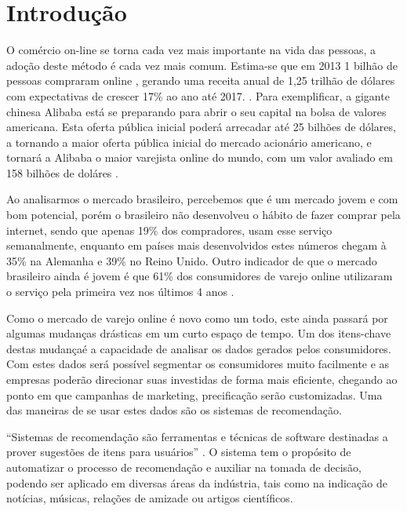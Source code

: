 \chapter[Introdução]{Introdução}
\label{chap:introducao}

O comércio on-line se torna cada vez mais importante na vida das pessoas, a adoção deste método é cada vez mais comum. Estima-se que em 2013 1 bilhão de pessoas compraram online \cite{emarketerB2CEcommerceClimbs}, gerando uma receita anual de 1,25 trilhão de dólares com expectativas de crescer 17\% ao ano até 2017. \cite{emarketerGlobalB2CSales}. Para exemplificar, a gigante chinesa Alibaba está se preparando para abrir o seu capital na bolsa de valores americana. Esta oferta pública inicial poderá arrecadar até 25 bilhões de dólares, a tornando a maior oferta pública inicial do mercado acionário americano, e tornará a Alibaba o maior varejista online do mundo, com um valor avaliado em 158 bilhões de doláres \cite{ForbesAlibabaBoostsIPO}.

Ao analisarmos o mercado brasileiro, percebemos que é um mercado jovem e com bom potencial, porém o brasileiro não desenvolveu o hábito de fazer comprar pela internet, sendo que apenas 19\% dos compradores, usam esse serviço semanalmente, enquanto em países mais desenvolvidos estes números chegam à 35\% na Alemanha e 39\% no Reino Unido. Outro indicador de que o mercado brasileiro ainda é jovem é que 61\% dos consumidores de varejo online utilizaram o serviço pela primeira vez nos últimos 4 anos \cite{PWCTotalRetail}.

Como o mercado de varejo online é novo como um todo, este ainda passará por algumas mudanças drásticas em um curto espaço de tempo. Um dos itens-chave destas mudançaé a capacidade de analisar os dados gerados pelos consumidores. Com estes dados será possível segmentar os consumidores muito facilmente e as empresas poderão direcionar suas investidas de forma mais eficiente, chegando ao ponto em que campanhas de marketing, precificação serão customizadas. \cite{BCGThegotomarketrevolution} Uma das maneiras de se usar estes dados são os sistemas de recomendação.

``Sistemas de recomendação são ferramentas e técnicas de software destinadas a prover sugestões de itens para usuários'' \cite{ricci2011introduction-chap1}. O sistema tem o propósito de automatizar o processo de recomendação e auxiliar na tomada de decisão, podendo ser aplicado em diversas áreas da indústria, tais como na indicação de notícias, músicas, relações de amizade ou artigos científicos.

